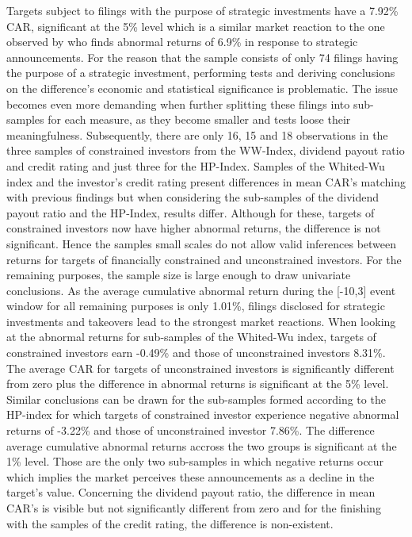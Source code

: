 \documentclass[12pt]{article}
\begin{document}
Targets subject to filings with the purpose of strategic investments have a 7.92\% CAR, significant at the 5\% level which is a similar market reaction to the one observed by \citet[p.]{Allen2000} who finds abnormal returns of 6.9\% in response to strategic announcements. For the reason that the sample consists of only 74 filings having the purpose of a strategic investment, performing tests and deriving conclusions on the difference's economic and statistical significance is problematic. The issue becomes even more demanding when further splitting these filings into sub-samples for each measure, as they become smaller and tests loose their meaningfulness. Subsequently, there are only 16, 15 and 18 observations in the three samples of constrained investors from the WW-Index, dividend payout ratio and credit rating and just three for the HP-Index. Samples of the Whited-Wu index and the investor's credit rating present differences in mean CAR's matching with previous findings but when considering the sub-samples of the dividend payout ratio and the HP-Index, results differ. Although for these, targets of constrained investors now have higher abnormal returns, the difference is not significant. Hence the samples small scales do not allow valid inferences between returns for targets of financially constrained and unconstrained investors.
For the remaining purposes, the sample size is large enough to draw univariate conclusions. As the average cumulative abnormal return during the [-10,3] event window for all remaining purposes is only 1.01\%,  filings disclosed for strategic investments and takeovers lead to the strongest market reactions. When looking at the abnormal returns for sub-samples of the Whited-Wu index, targets of constrained investors earn -0.49\% and those of unconstrained investors 8.31\%. The average CAR for targets of unconstrained investors is significantly different from zero plus the difference in abnormal returns is significant at the 5\% level. Similar conclusions can be drawn for the sub-samples formed according to the HP-index for which targets of constrained investor experience negative abnormal returns of -3.22\% and those of unconstrained investor 7.86\%. The difference average cumulative abnormal returns accross the two groups is significant at the 1\% level. Those are the only two sub-samples in which negative returns occur which implies the market perceives these announcements as a decline in the target's value.
Concerning the dividend payout ratio, the difference in mean CAR's is visible but not significantly different from zero and for the finishing with the samples of the credit rating, the difference is non-existent. 
\end{document}
